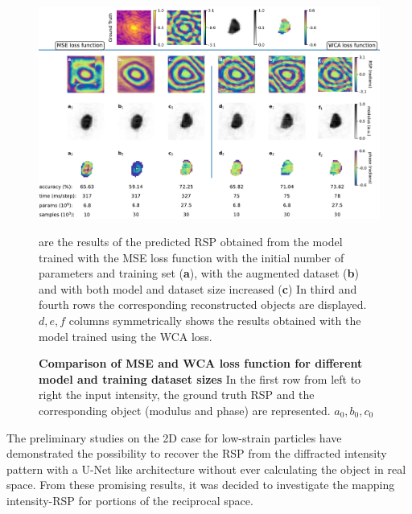 \begin{figure}[H]
    \centering
    \includegraphics[width=\textwidth]{figures/Phasing/model_comparison.pdf}
    \caption{\textbf{Comparison of MSE and WCA loss function for different model and training dataset sizes} In the first 
    row from left to right the input intensity, the ground truth RSP and the corresponding object (modulus and phase) are 
    represented. \textbf{$a_0, b_0, c_0$}} are the results of the predicted RSP obtained from the model trained with the 
    MSE loss function with the initial number of parameters and training set (\textbf{a}), with the augmented dataset (\textbf{b})
    and with both model and dataset size increased (\textbf{c}) In third and fourth rows the corresponding reconstructed 
    objects are displayed. \textbf{$d, e, f$} columns symmetrically shows the results obtained with the model trained using the WCA loss. 
    \label{fig:loss_comparison}
\end{figure}


The preliminary studies on the 2D case for low-strain particles have demonstrated the possibility to recover the RSP from 
the diffracted intensity pattern with a U-Net like architecture without ever calculating the object in real space.
From these promising results, it was decided to investigate the mapping intensity-RSP for portions of the reciprocal space. 


